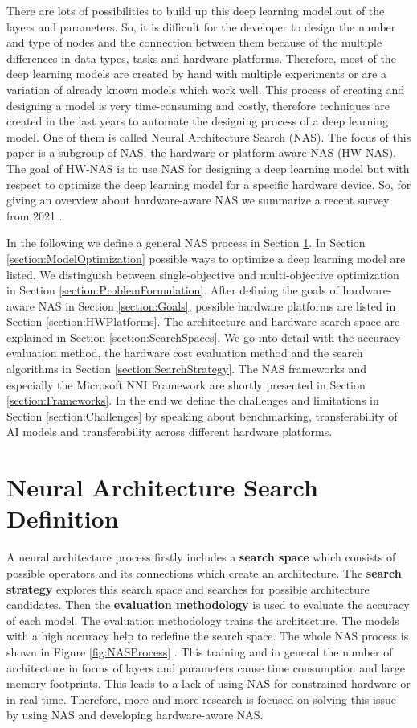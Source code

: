 \documentclass[conference]{IEEEtran}
\begin{document}
There are lots of possibilities to build up this deep learning model out of the layers and parameters. So, it is difficult for the developer to design the number and type of nodes and the connection between them because of the multiple differences in data types, tasks and hardware platforms. Therefore, most of the deep learning models are created by hand with multiple experiments or are a variation of already known models which work well. This process of creating and designing a model is very time-consuming and costly, therefore techniques are created in the last years to automate the designing process of a deep learning model. One of them is called Neural Architecture Search (NAS). The focus of this paper is a subgroup of NAS, the hardware or platform-aware NAS (HW-NAS). The goal of HW-NAS is to use NAS for designing a deep learning model but with respect to optimize the deep learning model for a specific hardware device. So, for giving an overview about hardware-aware NAS we summarize a recent survey from 2021 \cite{bib1}. 

In the following we define a general NAS process in Section \ref{section:NASDefinition}. In Section \ref{section:ModelOptimization} possible ways to optimize a deep learning model are listed. We distinguish between single-objective and multi-objective optimization in Section \ref{section:ProblemFormulation}. After defining the goals of hardware-aware NAS in Section \ref{section:Goals}, possible hardware platforms are listed in Section \ref{section:HWPlatforms}. The architecture and hardware search space are explained in Section \ref{section:SearchSpaces}. We go into detail with the accuracy evaluation method, the hardware cost evaluation method and the search algorithms in Section \ref{section:SearchStrategy}. The NAS frameworks and especially the Microsoft NNI Framework are shortly presented in Section \ref{section:Frameworks}. In the end we define the challenges and limitations in Section \ref{section:Challenges} by speaking about benchmarking, transferability of AI models and transferability across different hardware platforms.  

\section{Neural Architecture Search Definition}
\label{section:NASDefinition}
A neural architecture process firstly includes a \textbf{search space} which consists of possible operators and its connections which create an architecture. The \textbf{search strategy} explores this search space and searches for possible architecture candidates. Then the \textbf{evaluation methodology} is used to evaluate the accuracy of each model. The evaluation methodology trains the architecture. The models with a high accuracy help to redefine the search space. The whole NAS process is shown in Figure \ref{fig:NASProcess} \cite{bib1}. This training and in general the  number of architecture in forms of layers and parameters cause time consumption and large memory footprints. This leads to a lack of using NAS for constrained hardware or in real-time. Therefore, more and more research is focused on solving this issue by using NAS and developing hardware-aware NAS. 
\end{document}
